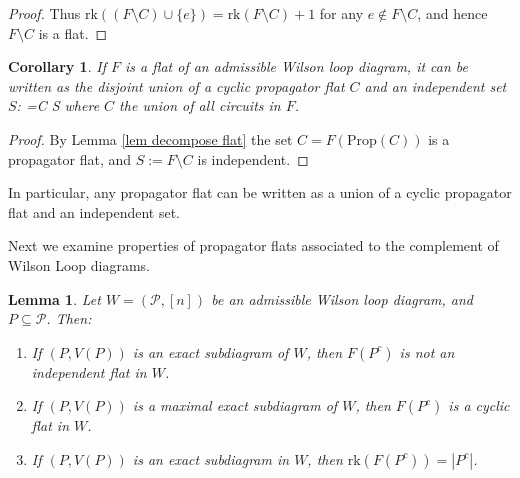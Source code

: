 \documentclass[11pt]{article}
\newcommand{\rk}{\textrm{rk} }
\def\bas #1\eas{\begin{align*} #1 \end{align*}}
\newcommand{\cP}{\mathcal{P}}
\newcommand{\Prop}{\textrm{Prop}}
\newtheorem{lem}[thm]{Lemma}
\newtheorem{cor}[thm]{Corollary}
\theoremstyle{remark}
\theoremstyle{definition}
\newtheorem{dfn}[thm]{Definition}
\begin{document}
\begin{proof}
Thus $\rk((F\setminus C)\cup \{e\}) = \rk(F\setminus C) + 1$ for any $e \not\in F\setminus C$, and hence $F\setminus C$ is a flat.
\end{proof}

\begin{cor} \label{classifyflats}
  If $F$ is a flat of an admissible Wilson loop diagram, it can be written as the disjoint union of a cyclic propagator flat $C$ and an independent set $S$: \bas F =C \sqcup S \eas where $C$ the union of all circuits in $F$. \end{cor}
 
\begin{proof}
By Lemma \ref{lem decompose flat} the set $C = F(\Prop(C))$ is a propagator flat, and $S := F \setminus C$ is independent.
\end{proof}

In particular, any propagator flat can be written as a union of a cyclic propagator flat and an independent set.

Next we examine properties of propagator flats associated to the complement of Wilson Loop diagrams.







\begin{lem} \label{maxexactcomplementrank}
Let $W = (\cP, [n])$ be an admissible Wilson loop diagram, and $P \subseteq \cP$. Then: \begin{enumerate}
\item If $(P,V(P))$ is an exact subdiagram of $W$, then $F(P^c)$ is not an independent flat in $W$.
\item If $(P,V(P))$ is a maximal exact subdiagram of $W$, then $F(P^c)$ is a cyclic flat in $W$.
\item If $(P,V(P))$ is an exact subdiagram in $W$, then $\rk(F(P^c)) = |P^c|$.
\end{enumerate} 
\end{lem}
\end{document}
